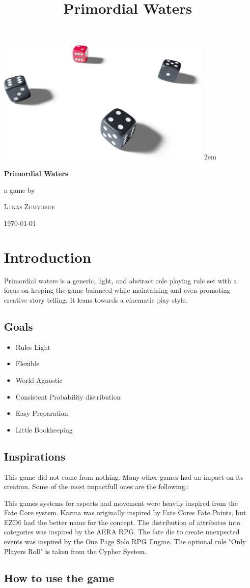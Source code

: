 \documentclass[11pt]{article}
\date{}
\title{Primordial Waters}
\renewcommand\maketitle{
\begin{titlepage}
\centering
\includegraphics[width=0.8\textwidth]{dice_cut.png}
\topskip250pt\vspace{5cm}
\fboxsep2em\colorbox{black!100}{
{\color{white}\bfseries\fontsize{24pt}{29pt}\selectfont \quad Primordial Waters\quad\par}
}
\vfill
a game by\par
\textsc{Lukas Zumvorde}

\vfill

{\large \today\par}
\end{titlepage}}
\let\oldtableofcontents\tableofcontents
\renewcommand\tableofcontents{
\oldtableofcontents
\clearpage
}
\begin{document}
\maketitle
\tableofcontents

{


\section{Introduction}
\label{sec:org83570d7}

Primordial waters is a generic, light, and abstract role playing rule set with a focus on keeping the game balanced while maintaining and even promoting creative story telling. It leans towards a cinematic play style.

\subsection{Goals}
\label{sec:org9a99bef}

\begin{itemize}
\item Rules Light
\item Flexible
\item World Agnostic
\item Consistent Probability distribution
\item Easy Preparation
\item Little Bookkeeping
\end{itemize}

\subsection{Inspirations}
\label{sec:orgb30c094}

This game did not come from nothing. Many other games had an impact on its creation. Some of the most impactfull ones are the following.:

This games systems for aspects and movement were heavily inspired from the Fate Core system.
Karma was originally inspired by Fate Cores Fate Points, but EZD6 had the better name for the concept.
The distribution of attributes into categories was inspired by the AERA RPG.
The fate die to create unexpected events was inspired by the One Page Solo RPG Engine.
The optional rule "Only Players Roll" is taken from the Cypher System.

\subsection{How to use the game}
\label{sec:org141a974}

}
\end{document}
